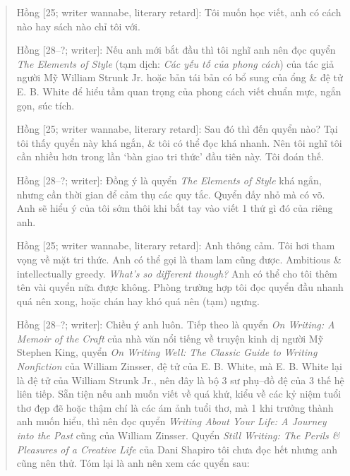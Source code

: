 \documentclass[12pt,oneside]{book}
\begin{document}
\begin{quote}
	{\sf Hồng [25; writer wannabe, literary retard]}: Tôi muốn học viết, anh có cách nào hay sách nào chỉ tôi với.
	
	{\sf Hồng [28--?; writer]}: Nếu anh mới bắt đầu thì tôi nghĩ anh nên đọc quyển {\it The Elements of Style} \cite{Strunk_element_style} (tạm dịch: {\it Các yếu tố của phong cách}) của tác giả người Mỹ {\sc William Strunk Jr.} hoặc bản tái bản có bổ sung \cite{Strunk_White_element_style} của ổng \& đệ tử {\sc E. B. White} để hiểu tầm quan trọng của phong cách viết chuẩn mực, ngắn gọn, súc tích.
	
	{\sf Hồng [25; writer wannabe, literary retard]}: Sau đó thì đến quyển nào? Tại tôi thấy quyển này khá ngắn, \& tôi có thể đọc khá nhanh. Nên tôi nghĩ tôi cần nhiều hơn trong lần `bàn giao tri thức' đầu tiên này. Tôi đoán thế.
	
	{\sf Hồng [28--?; writer]}: Đồng ý là quyển {\it The Elements of Style} khá ngắn, nhưng cần thời gian để cảm thụ các quy tắc. Quyển đấy nhỏ mà có võ. Anh sẽ hiểu ý của tôi sớm thôi khi bắt tay vào viết 1 thứ gì đó của riêng anh.
	
	{\sf Hồng [25; writer wannabe, literary retard]}: Anh thông cảm. Tôi hơi tham vọng về mặt tri thức. Anh có thể gọi là tham lam cũng được. Ambitious \& intellectually greedy. {\it What's so different though?} Anh có thể cho tôi thêm tên vài quyển nữa được không. Phòng trường hợp tôi đọc quyển đầu nhanh quá nên xong, hoặc chán hay khó quá nên (tạm) ngưng.
	
	{\sf Hồng [28--?; writer]}: Chiều ý anh luôn. Tiếp theo là quyển {\it On Writing: A Memoir of the Craft} \cite{King2000,King2010} của nhà văn nổi tiếng về truyện kinh dị người Mỹ {\sc Stephen King}, quyển {\it On Writing Well: The Classic Guide to Writing Nonfiction} \cite{Zinsser2001,Zinsser2016} của {\sc William Zinsser}, đệ tử của {\sc E. B. White}, mà {\sc E. B. White} lại là đệ tử của {\sc William Strunk Jr.}, nên đây là bộ 3 sư phụ--đồ đệ của 3 thế hệ liên tiếp. Sẵn tiện nếu anh muốn viết về quá khứ, kiểu về các kỷ niệm tuổi thơ đẹp đẽ hoặc thậm chí là các ám ảnh tuổi thơ, mà 1 khi trưởng thành anh muốn hiểu, thì nên đọc quyển {\it Writing About Your Life: A Journey into the Past} \cite{Zinsser2005} cũng của {\sc William Zinsser}. Quyển {\it Still Writing: The Perils \& Pleasures of a Creative Life} của {\sc Dani Shapiro} tôi chưa đọc hết nhưng anh cũng nên thử. Tóm lại là anh nên xem các quyển sau:
\end{quote}
\end{document}
